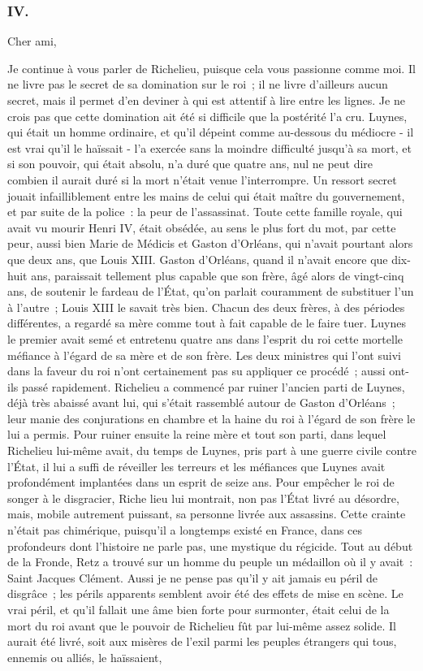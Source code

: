\documentclass[french,twoside]{book} %
\begin{document}
\subsubsection[{IV.}]{IV.}
\noindent Cher ami,\par
Je continue à vous parler de Richelieu, puisque cela vous passionne com­me moi. Il ne livre pas le secret de sa domination sur le roi ; il ne livre d'ailleurs aucun secret, mais il permet d'en deviner à qui est attentif à lire entre les lignes. Je ne crois pas que cette domination ait été si difficile que la postérité l'a cru. Luynes, qui était un homme ordinaire, et qu'il dépeint comme au-dessous du médiocre - il est vrai qu'il le haïssait - l'a exercée sans la moindre difficulté jusqu'à sa mort, et si son pouvoir, qui était absolu, n'a duré que quatre ans, nul ne peut dire combien il aurait duré si la mort n'était venue l'interrompre. Un ressort secret jouait infailliblement entre les mains de celui qui était maître du gouvernement, et par suite de la police : la peur de l'assas­sinat. Toute cette famille royale, qui avait vu mourir Henri IV, était obsédée, au sens le plus fort du mot, par cette peur, aussi bien Marie de Médicis et Gaston d'Orléans, qui n'avait pourtant alors que deux ans, que Louis XIII. Gaston d'Orléans, quand il n'avait encore que dix-huit ans, paraissait tellement plus capable que son frère, âgé alors de vingt-cinq ans, de soutenir le fardeau de l'État, qu'on parlait couramment de substituer l'un à l'autre ; Louis XIII le savait très bien. Chacun des deux frères, à des périodes différentes, a regardé sa mère comme tout à fait capable de le faire tuer. Luynes le premier avait semé et entretenu quatre ans dans l'esprit du roi cette mortelle méfiance à l'égard de sa mère et de son frère. Les deux ministres qui l'ont suivi dans la faveur du roi n'ont certainement pas su appliquer ce procédé ; aussi ont-ils passé rapidement. Richelieu a commencé par ruiner l'ancien parti de Luynes, déjà très abaissé avant lui, qui s'était rassemblé autour de Gaston d'Orléans ; leur manie des conjurations en chambre et la haine du roi à l'égard de son frère le lui a permis. Pour ruiner ensuite la reine mère et tout son parti, dans lequel Richelieu lui-même avait, du temps de Luynes, pris part à une guerre civile contre l'État, il lui a suffi de réveiller les terreurs et les méfiances que Luynes avait profondément implantées dans un esprit de seize ans. Pour empêcher le roi de songer à le disgracier, Riche lieu lui montrait, non pas l'État livré au désordre, mais, mobile autrement puissant, sa personne livrée aux assassins. Cette crainte n'était pas chimérique, puisqu'il a longtemps existé en France, dans ces profondeurs dont l'histoire ne parle pas, une mystique du régicide. Tout au début de la Fronde, Retz a trouvé sur un homme du peuple un mé­daillon où il y avait : Saint Jacques Clément. Aussi je ne pense pas qu'il y ait jamais eu péril de disgrâce ; les périls apparents semblent avoir été des effets de mise en scène. Le vrai péril, et qu'il fallait une âme bien forte pour surmon­ter, était celui de la mort du roi avant que le pouvoir de Richelieu fût par lui-même assez solide. Il aurait été livré, soit aux misères de l'exil parmi les peuples étrangers qui tous, ennemis ou alliés, le haïssaient, 
\end{document}
